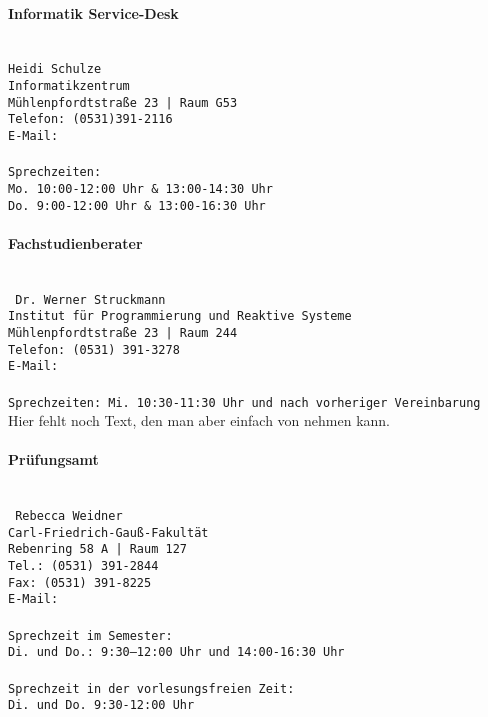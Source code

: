 \paragraph{\small Informatik Service-Desk} \ \\
\texttt{Heidi Schulze\\
Informatikzentrum\\
Mühlenpfordtstraße 23 | Raum G53\\
Telefon: (0531)391-2116\\
E-Mail: \\
\\
Sprechzeiten: \\
Mo. 10:00-12:00 Uhr
\& 13:00-14:30 Uhr
\\
Do. 9:00-12:00 Uhr
\& 13:00-16:30 Uhr
}

\paragraph{\small{Fachstudienberater}}\ \\
\texttt{
Dr. Werner Struckmann\\
Institut für Programmierung und Reaktive Systeme\\
Mühlenpfordtstraße 23 | Raum 244\\
Telefon: (0531) 391-3278\\
E-Mail: \\
\\
Sprechzeiten: Mi. 10:30-11:30 Uhr und nach vorheriger Vereinbarung
}
Hier fehlt noch Text, den man aber einfach von
nehmen kann.
\paragraph{\small{Prüfungsamt}} \ \\
\texttt{
Rebecca Weidner\\
Carl-Friedrich-Gauß-Fakultät\\
Rebenring 58 A | Raum 127\\
Tel.: (0531) 391-2844\\
Fax: (0531) 391-8225\\
E-Mail: \\
\\
Sprechzeit im Semester:\\
Di. und Do.:
9:30–12:00 Uhr und 14:00-16:30 Uhr\\
\\
Sprechzeit in der vorlesungsfreien Zeit:\\
Di. und Do.
9:30-12:00 Uhr \\
}

